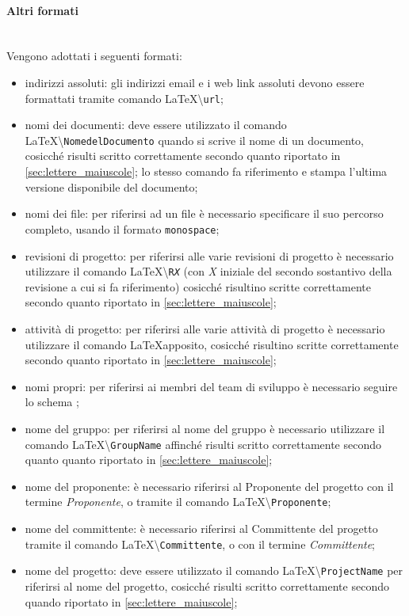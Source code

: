 \paragraph{Altri formati} \mbox{} \\
Vengono adottati i seguenti formati:
\begin{itemize}
	\item indirizzi assoluti: gli indirizzi email e i web link assoluti devono essere formattati tramite comando \LaTeX\space \textbackslash{\texttt{url}};
	\item nomi dei documenti: deve essere utilizzato il comando \LaTeX\space \textbackslash{\texttt{NomedelDocumento}} quando si scrive il nome di un documento, cosicché risulti scritto correttamente secondo quanto riportato in \sezione\ref{sec:lettere_maiuscole}; lo stesso comando fa riferimento e stampa l'ultima versione disponibile del documento;
	\item nomi dei file: per riferirsi ad un file è necessario specificare il suo percorso completo, usando il formato \texttt{monospace};
	\item revisioni di progetto: per riferirsi alle varie revisioni di progetto è necessario utilizzare il comando \LaTeX\space \textbackslash{\texttt{R\textit{X}}} (con \textit{X} iniziale del secondo sostantivo della revisione a cui si fa riferimento) cosicché risultino scritte correttamente secondo quanto riportato in \sezione\ref{sec:lettere_maiuscole};
	\item attività di progetto: per riferirsi alle varie attività di progetto è necessario utilizzare il comando \LaTeX\space apposito, cosicché risultino scritte correttamente secondo quanto riportato in \sezione\ref{sec:lettere_maiuscole};
	\item nomi propri: per riferirsi ai membri del team di sviluppo è necessario seguire lo schema ;
	\item nome del gruppo: per riferirsi al nome del gruppo è necessario utilizzare il comando \LaTeX\space \textbackslash{\texttt{GroupName}} affinché risulti scritto correttamente secondo quanto quanto riportato in \sezione\ref{sec:lettere_maiuscole};
	\item nome del proponente: è necessario riferirsi al Proponente del progetto con il termine \textit{Proponente}, o tramite il comando \LaTeX\space \textbackslash{\texttt{Proponente}};
	\item nome del committente: è necessario riferirsi al Committente del progetto tramite il comando \LaTeX\space \textbackslash{\texttt{Committente}}, o con il termine \textit{Committente};
	\item nome del progetto: deve essere utilizzato il comando \LaTeX\space \textbackslash{\texttt{ProjectName}} per riferirsi al nome del progetto, cosicché risulti scritto correttamente secondo quando riportato in \sezione\ref{sec:lettere_maiuscole};
\end{itemize}

